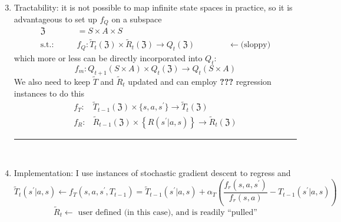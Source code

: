 
\begin{enumerate}[label=\protect\textcircled{\arabic*}]
\setcounter{enumi}{2}
\item Tractability: it is not possible to map infinite state spaces in practice, so it is advantageous to set up $f_Q$ on a 
subspace \begin{align*}
\mathfrak{Z} & = S \times A \times S \\
\text{s.t.:}\qquad & f_Q: \tilde{T}_t( \mathfrak{Z} ) \times \tilde{R}_t ( \mathfrak{Z} ) \rightarrow Q_t( \mathfrak{Z} )\qquad\qquad \leftarrow\text{(sloppy)}
\end{align*}
which more or less can be directly incorporated into $Q_t$:
\begin{equation*}
f_m: Q_{t+1}( S \times A ) \times Q_t(\mathfrak{Z}) \rightarrow Q_t(S\times A)
\end{equation*}
We also need to keep $\tilde{T}$ and $\tilde{R}_t$ updated and can employ \textbf{???} regression instances to do this
\begin{align*}
f_T: & \tilde{T}_{t-1}(\mathfrak{Z})\times\{s,a,s^\prime\}\rightarrow \tilde{T}_t(\mathfrak{Z}) \\
f_R: & \tilde{R}_{t-1}( \mathfrak{Z} ) \times \left\{  R( s^\prime | a, s ) \right\} \rightarrow \tilde{R}_t( \mathfrak{Z} )
\end{align*}
\hrule
{\ }\\

\item Implementation: I use instances of stochastic gradient descent to regress  and 
\begin{equation*}
\tilde{T}_t(s^\prime | a, s ) \leftarrow f_T(s,a,s^\prime,T_{t-1}) = \tilde{T}_{t-1}(s^\prime|a,s)+\alpha_T\left(\frac{f_r(s,a,s^\prime)}{f_r(s,a)}-T_{t-1}(s^\prime|a,s)\right)
\end{equation*}
\begin{equation*}
\tilde{R}_t \leftarrow\text{\ user defined (in this case), and is readily ``pulled''}
\end{equation*}
\end{enumerate}